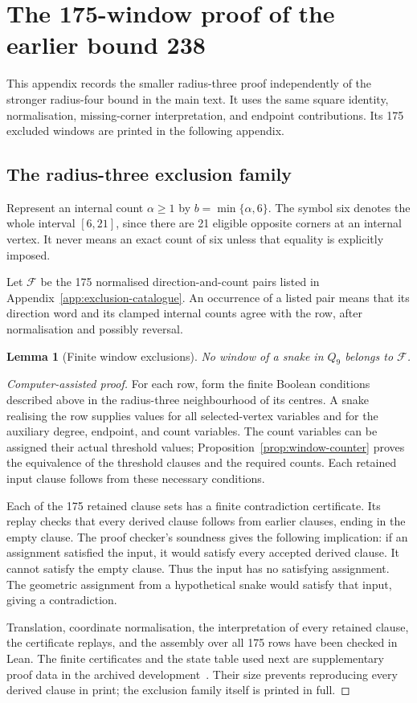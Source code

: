 \documentclass[11pt,a4paper]{article}
\newtheorem{lemma}[theorem]{Lemma}
\theoremstyle{definition}
\theoremstyle{remark}
\newcommand{\Q}{Q}
\begin{document}
\section{The 175-window proof of the earlier bound 238}\label{app:bound238}
This appendix records the smaller radius-three proof independently of the stronger radius-four bound in the main text. It uses the same square identity, normalisation, missing-corner interpretation, and endpoint contributions. Its 175 excluded windows are printed in the following appendix.

\subsection{The radius-three exclusion family}
Represent an internal count $\alpha\ge1$ by $b=\min\{\alpha,6\}$. The symbol six denotes the whole interval $[6,21]$, since there are 21 eligible opposite corners at an internal vertex. It never means an exact count of six unless that equality is explicitly imposed.

Let $\mathcal F$ be the 175 normalised direction-and-count pairs listed in Appendix~\ref{app:exclusion-catalogue}. An occurrence of a listed pair means that its direction word and its clamped internal counts agree with the row, after normalisation and possibly reversal.

\begin{lemma}[Finite window exclusions]\label{lem:finite-exclusions}
No window of a snake in $\Q_9$ belongs to $\mathcal F$.
\end{lemma}
\begin{proof}[Computer-assisted proof]
For each row, form the finite Boolean conditions described above in the radius-three neighbourhood of its centres. A snake realising the row supplies values for all selected-vertex variables and for the auxiliary degree, endpoint, and count variables. The count variables can be assigned their actual threshold values; Proposition~\ref{prop:window-counter} proves the equivalence of the threshold clauses and the required counts. Each retained input clause follows from these necessary conditions.

Each of the 175 retained clause sets has a finite contradiction certificate. Its replay checks that every derived clause follows from earlier clauses, ending in the empty clause. The proof checker's soundness gives the following implication: if an assignment satisfied the input, it would satisfy every accepted derived clause. It cannot satisfy the empty clause. Thus the input has no satisfying assignment. The geometric assignment from a hypothetical snake would satisfy that input, giving a contradiction.

Translation, coordinate normalisation, the interpretation of every retained clause, the certificate replays, and the assembly over all 175 rows have been checked in Lean. The finite certificates and the state table used next are supplementary proof data in the archived development~\cite{proofarchive}. Their size prevents reproducing every derived clause in print; the exclusion family itself is printed in full.
\end{proof}
\end{document}
